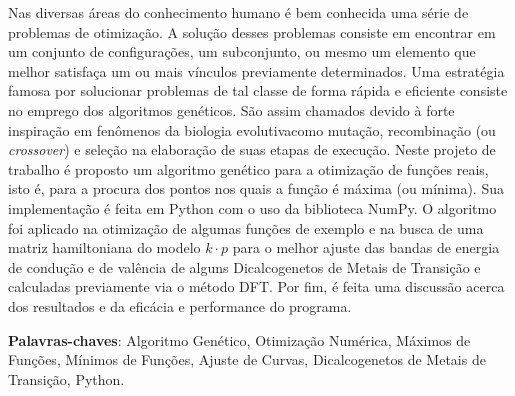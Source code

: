 Nas diversas áreas do conhecimento humano é bem conhecida uma série de problemas de otimização. 
A solução desses problemas consiste em encontrar em um conjunto de configurações, um subconjunto,
ou mesmo um elemento que melhor satisfaça um ou mais vínculos previamente determinados. Uma
estratégia famosa por solucionar problemas de tal classe de forma rápida e eficiente consiste no
emprego dos algoritmos genéticos. São assim chamados devido à forte inspiração em fenômenos
da biologia evolutiva\trav como mutação, recombinação (ou \textit{crossover}) e seleção\trav
na elaboração de suas etapas de execução. Neste projeto de trabalho é proposto um algoritmo genético para
a otimização de funções reais, isto é, para a procura dos pontos nos quais a função é máxima
(ou mínima). Sua implementação é feita em Python com o uso da biblioteca NumPy. 
O algoritmo foi aplicado na otimização de algumas funções de exemplo e na busca
de uma matriz hamiltoniana do modelo $ k \cdot p $ para o melhor ajuste das bandas de
energia de condução e de valência de alguns Dicalcogenetos de Metais de Transição\trav {} e
\trav calculadas previamente via o método DFT. Por fim, é feita uma discussão
acerca dos resultados e da eficácia e performance do programa. 

\vspace{\onelineskip}\noindent
\textbf{Palavras-chaves}: Algoritmo Genético, Otimização Numérica, Máximos de
Funções, Mínimos de Funções, Ajuste de Curvas, Dicalcogenetos de Metais de
Transição, Python.